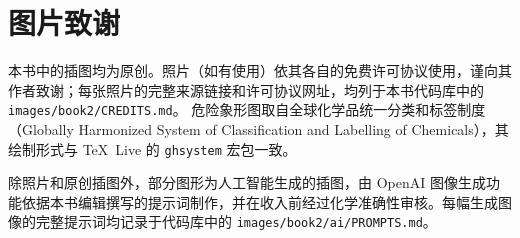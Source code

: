 \chapter*{图片致谢}

本书中的插图均为原创。照片（如有使用）依其各自的免费许可协议使用，谨向其作者致谢；每张照片的完整来源链接和许可协议网址，均列于本书代码库中的 \texttt{images/book2/CREDITS.md}。
危险象形图取自全球化学品统一分类和标签制度（Globally Harmonized System of
Classification and Labelling of Chemicals），其绘制形式与 \TeX\ Live 的 \texttt{ghsystem} 宏包一致。

\bigskip
除照片和原创插图外，部分图形为人工智能生成的插图，由 OpenAI 图像生成功能依据本书编辑撰写的提示词制作，并在收入前经过化学准确性审核。每幅生成图像的完整提示词均记录于代码库中的 \texttt{images/book2/ai/PROMPTS.md}。

